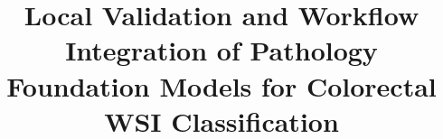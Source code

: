 \documentclass[runningheads]{llncs}
\begin{document}
%
\title{Local Validation and Workflow Integration of Pathology Foundation Models for Colorectal WSI Classification}
%

\end{document}
